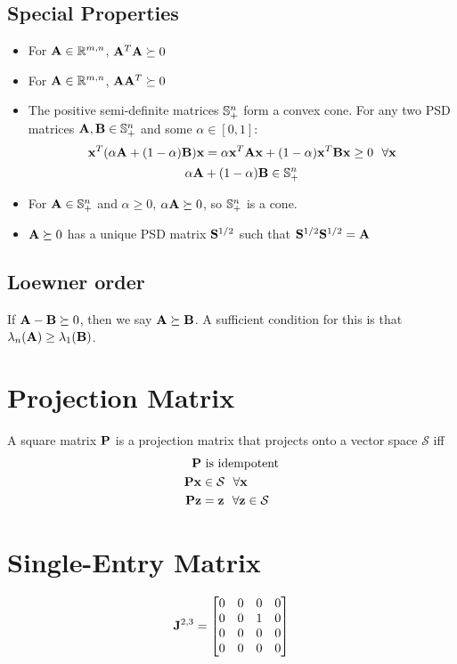 \subsection*{Special Properties}
\begin{itemize}
\item For $\mathbf{A}\in\mathbb{R}^{m,n}$, $\mathbf{A}^T\mathbf{A}\succeq0$
\item For $\mathbf{A}\in\mathbb{R}^{m,n}$, $\mathbf{A}\mathbf{A}^T\succeq0$
\item The positive semi-definite matrices $\mathbb{S}^n_+$ form a convex cone. For any two PSD matrices $\mathbf{A},\mathbf{B}\in\mathbb{S}^n_+$ and some $\alpha\in[0,1]$:
\begin{equation}
\mathbf{x}^T(\alpha\mathbf{A}+(1-\alpha)\mathbf{B})\mathbf{x}=\alpha \mathbf{x}^T\mathbf{A}\mathbf{x}+(1-\alpha)\mathbf{x}^T\mathbf{B}\mathbf{x}\ge0~~\forall\mathbf{x}
\end{equation}
\begin{equation}
\alpha\mathbf{A}+(1-\alpha)\mathbf{B}\in\mathbb{S}^n_+
\end{equation}
\item For $\mathbf{A}\in\mathbb{S}^n_+$ and $\alpha\ge0$, $\alpha\mathbf{A}\succeq0$, so $\mathbb{S}^n_+$ is a cone.
\item $\mathbf{A}\succeq 0$ has a unique PSD matrix $\mathbf{S}^{1/2}$ such that $\mathbf{S}^{1/2}\mathbf{S}^{1/2}=\mathbf{A}$
\end{itemize}

\subsection{Loewner order}
If $\mathbf{A}-\mathbf{B}\succeq 0$, then we say $\mathbf{A}\succeq \mathbf{B}$. A sufficient condition for this is that $\lambda_n(\mathbf{A})\ge\lambda_1(\mathbf{B})$.



\section{Projection Matrix}
A square matrix $\mathbf{P}$ is a projection matrix that projects onto a vector space $\mathcal{S}$ iff
\begin{align}
\mathbf{P}&~\textrm{is idempotent} \\
\mathbf{P}\mathbf{x}&\in\mathcal{S}~~\forall\mathbf{x} \\
\mathbf{P}\mathbf{z}&=\mathbf{z}~~\forall\mathbf{z}\in\mathcal{S}
\end{align}


\section{Single-Entry Matrix}
\label{sec:rogue_single_entry} 
\begin{equation}
\mathbf{J}^{2,3} =
\begin{bmatrix}
0 & 0 & 0 & 0 \\
0 & 0 & 1 & 0 \\
0 & 0 & 0 & 0 \\
0 & 0 & 0 & 0
\end{bmatrix}
\end{equation}

